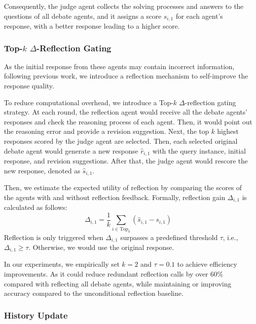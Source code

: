 \documentclass[letterpaper]{article} %
\begin{document}
Consequently, the judge agent collects the solving processes and answers to the questions of all debate agents, and it assigns a score $s_{i,1}$ for each agent's response, with a better response leading to a higher score. 









\subsubsection{Top-$k$ $\Delta$-Reflection Gating}
\label{subsec:reflection_gating}

As the initial response from these agents may contain incorrect information, following previous work, we introduce a reflection mechanism to self-improve the response quality.

To reduce computational overhead, we introduce a Top-$k$ $\Delta$-reflection gating strategy. At each round,  the reflection agent would receive all the debate agents' responses and check the reasoning process of each agent. Then, it would point out the reasoning error and provide a revision suggestion. Next, the top $k$ highest responses scored by the judge agent are selected. Then, each selected original debate agent would generate a new response $\hat{r}_{i,1}$ with the query instance, initial response, and revision suggestions. After that, the judge agent would rescore the new response, denoted as  $\hat{s}_{i,1}$. 

Then, we estimate the expected utility of reflection by comparing the scores of the agents with and without reflection feedback. Formally, reflection gain $\Delta_{i,1}$ is calculated as follows:
\begin{equation}
    \Delta_{i,1} = \frac{1}{k}\sum_{i\in \text{Top}_k}\left(\hat{s}_{i,1} - s_{i,1}\right)
\end{equation}
Reflection is only triggered when $\Delta_{i,1}$ surpasses a predefined threshold $\tau$, i.e., $\Delta_{i,1} \geq \tau$. Otherwise, we would use the original response.

In our experiments, we empirically set $k=2$ and $\tau=0.1$ to achieve efficiency improvements. As it could reduce redundant reflection calls by over 60\% compared with reflecting all debate agents, while maintaining or improving accuracy compared to the unconditional reflection baseline.

\subsubsection{History Update} 
\end{document}
